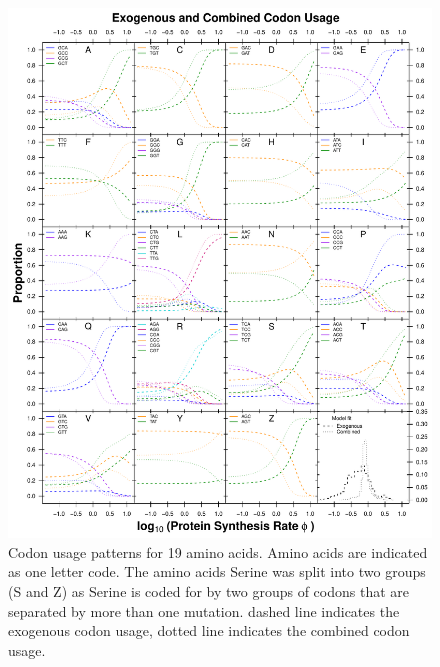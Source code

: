 \documentclass[doublespacing,linenumbers]{bmcart-modified}
\begin{document}
\begin{backmatter}
\begin{figure}
	\includegraphics[width=\textwidth]{img/figS3.pdf}%
	\caption{Codon usage patterns for 19 amino acids. Amino acids are indicated as one letter code. 
	The amino acids Serine was split into two groups (S and Z) as Serine is coded for by two groups of codons that are separated by more than one mutation.
	dashed line indicates the exogenous codon usage, dotted line indicates the combined codon usage.}
	\label{fig:cub_full_cleft}
\end{figure}


\end{backmatter}
\end{document}
